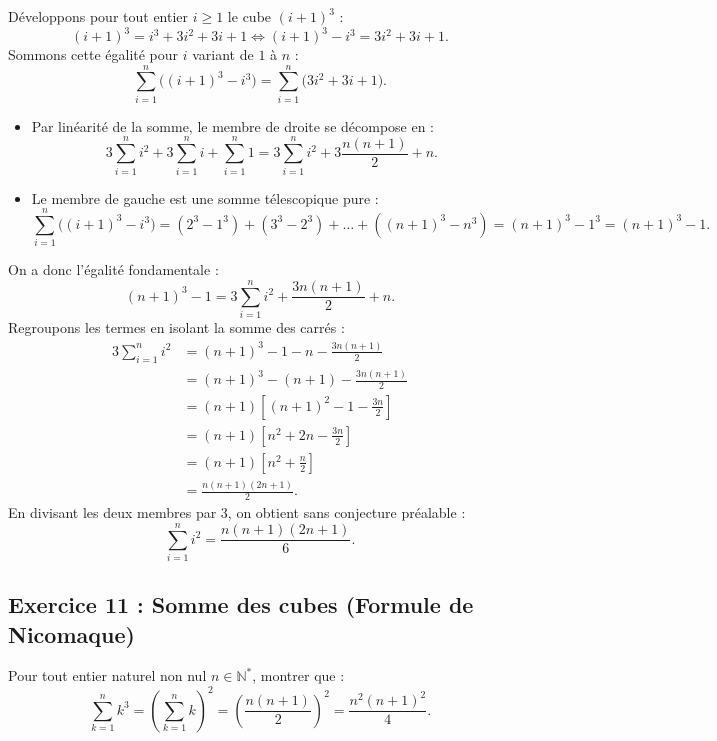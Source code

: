 \documentclass[11pt,a4paper]{article}
\newcommand{\N}{\mathbb{N}}
\begin{document}
\begin{correctionbox}
Développons pour tout entier $i \ge 1$ le cube $(i+1)^3$ :
\[
(i+1)^3 = i^3 + 3i^2 + 3i + 1 \iff (i+1)^3 - i^3 = 3i^2 + 3i + 1.
\]
Sommons cette égalité pour $i$ variant de $1$ à $n$ :
\[
\sum_{i=1}^n \Big( (i+1)^3 - i^3 \Big) = \sum_{i=1}^n \Big( 3i^2 + 3i + 1 \Big).
\]
\begin{itemize}
    \item Par linéarité de la somme, le membre de droite se décompose en :
    \[
    3 \sum_{i=1}^n i^2 + 3 \sum_{i=1}^n i + \sum_{i=1}^n 1 = 3 \sum_{i=1}^n i^2 + 3 \frac{n(n+1)}{2} + n.
    \]
    \item Le membre de gauche est une somme télescopique pure :
    \[
    \sum_{i=1}^n \Big( (i+1)^3 - i^3 \Big) = (2^3 - 1^3) + (3^3 - 2^3) + \dots + ((n+1)^3 - n^3) = (n+1)^3 - 1^3 = (n+1)^3 - 1.
    \]
\end{itemize}
On a donc l'égalité fondamentale :
\[
(n+1)^3 - 1 = 3 \sum_{i=1}^n i^2 + \frac{3n(n+1)}{2} + n.
\]
Regroupons les termes en isolant la somme des carrés :
\begin{align*}
3 \sum_{i=1}^n i^2 &= (n+1)^3 - 1 - n - \frac{3n(n+1)}{2} \\
                   &= (n+1)^3 - (n+1) - \frac{3n(n+1)}{2} \\
                   &= (n+1) \left[ (n+1)^2 - 1 - \frac{3n}{2} \right] \\
                   &= (n+1) \left[ n^2 + 2n - \frac{3n}{2} \right] \\
                   &= (n+1) \left[ n^2 + \frac{n}{2} \right] \\
                   &= \frac{n(n+1)(2n+1)}{2}.
\end{align*}
En divisant les deux membres par $3$, on obtient sans conjecture préalable :
\[
\sum_{i=1}^n i^2 = \frac{n(n+1)(2n+1)}{6}.
\]
\end{correctionbox}

\subsection*{Exercice 11 : Somme des cubes (Formule de Nicomaque)}

Pour tout entier naturel non nul $n \in \N^*$, montrer que :
\[
\sum_{k=1}^n k^3 = \left(\sum_{k=1}^n k\right)^2 = \left(\frac{n(n+1)}{2}\right)^2 = \frac{n^2(n+1)^2}{4}.
\]
\end{document}
